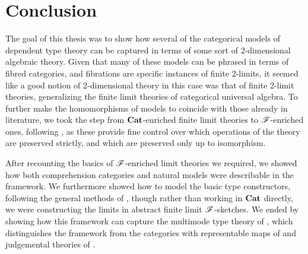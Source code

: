 \documentclass[../thesis.tex]{subfiles}
\begin{document}
\chapter{Conclusion}\label{ch:conclusion}
The goal of this thesis was to show how several of the categorical models of dependent type theory can be captured in terms
of some sort of 2-dimensional algebraic theory. Given that many of these models can be phrased in terms of fibred categories,
and fibrations are specific instances of finite 2-limits, it seemed like a good notion of 2-dimensional theory in this case
was that of finite 2-limit theories, generalizing the finite limit theories of categorical universal algebra. To further
make the homomorphisms of models to coincide with those already in literature, we took the step from ${\mathbf{Cat}}$-enriched
finite limit theories to ${\mathscr{F}}$-enriched ones, following \cite{arkor2024}, as these provide fine control over which operations
of the theory are preserved strictly, and which are preserved only up to isomorphism. 

After recounting the basics of ${\mathscr{F}}$-enriched limit theories we required, we showed how both comprehension categories and
natural models were describable in the framework. We furthermore showed how to model the basic type constructors, following
the general methods of \cite{coraglia2024a}, though rather than working in ${\mathbf{Cat}}$ directly, we were constructing the limits
in abstract finite limit ${\mathscr{F}}$-sketches. We ended by showing how this framework can capture the multimode type theory of \cite{
gratzer2021}, which distinguishes the framework from the categories with representable maps of \cite{uemura2023} and judgemental
theories of \cite{coraglia2024a}. 
\end{document}
